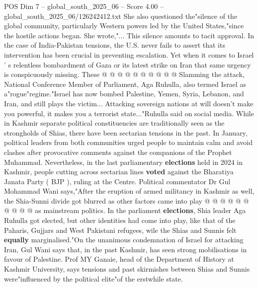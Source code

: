 \begin{textsample}{POS Dim 7 – global\_south\_2025\_06 – Score 4.00 – global\_south\_2025\_06/126242412.txt}
She also questioned the"silence of the global community, particularly Western powers led by the United States,"since the hostile actions began.
She wrote,"...
This silence amounts to tacit approval.
In the case of India-Pakistan tensions, the U.S. never fails to assert that its intervention has been crucial in preventing escalation.
Yet when it comes to Israel ' s relentless bombardment of Gaza or its latest strike on Iran that same urgency is conspicuously missing.
These @ @ @ @ @ @ @ @ @ @ Slamming the attack, National Conference Member of Parliament, Aga Ruhulla, also termed Israel as a"rogue"regime."Israel has now bombed Palestine, Yemen, Syria, Lebanon, and Iran, and still plays the victim...
Attacking sovereign nations at will doesn't make you powerful, it makes you a terrorist state..."Ruhulla said on social media.
While in Kashmir separate political constituencies are traditionally seen as the strongholds of Shias, there have been sectarian tensions in the past.
In January, political leaders from both communities urged people to maintain calm and avoid clashes after provocative comments against the companions of the Prophet Muhammad.
Nevertheless, in the last parliamentary \textbf{elections} held in 2024 in Kashmir, people cutting across sectarian lines \textbf{voted} against the Bharatiya Janata Party ( BJP ), ruling at the Centre.
Political commentator Dr Gul Mohammad Wani says,"After the eruption of armed militancy in Kashmir as well, the Shia-Sunni divide got blurred as other factors came into play @ @ @ @ @ @ @ @ @ @ as mainstream politics.
In the parliament \textbf{elections}, Shia leader Aga Ruhulla got elected, but other identities had come into play, like that of the Paharis, Gujjars and West Pakistani refugees, wile the Shias and Sunnis felt \textbf{equally} marginalised."On the unanimous condemnation of Israel for attacking Iran, Gul Wani says that, in the past Kashmir, has seen strong mobilisations in favour of Palestine.
Prof MY Ganaie, head of the Department of History at Kashmir University, says tensions and past skirmishes between Shias and Sunnis were"influenced by the political elite"of the erstwhile state.

\end{textsample}

